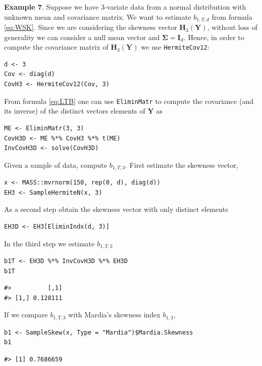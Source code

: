 \textbf{Example 7}. Suppose we have \(3\)-variate data from a normal distribution with unknown mean and covariance matrix. We want to estimate \(b_{1,T,d}\) from formula \eqref{eq:WSK}. Since we are considering the skewness vector \(\mathbf{H}_3(\mathbf{Y})\), without loss of generality we can consider a null mean vector and \(\boldsymbol{\Sigma}= \mathbf{I}_d\). Hence, in order to compute the covariance matrix of \(\mathbf{H}_3(\mathbf{Y})\) we use \texttt{HermiteCov12}:

\begin{verbatim}
d <- 3
Cov <- diag(d)
CovH3 <- HermiteCov12(Cov, 3)
\end{verbatim}

From formula \eqref{eq:LTB} one can use \texttt{EliminMatr} to compute the covariance (and its inverse) of the distinct vectors elements of \(\mathbf{Y}\) as

\begin{verbatim}
ME <- EliminMatr(3, 3)
CovH3D <- ME %*% CovH3 %*% t(ME)
InvCovH3D <- solve(CovH3D)
\end{verbatim}

Given a sample of data, compute \(b_{1,T,3}\). First estimate the skewness vector,

\begin{verbatim}
x <- MASS::mvrnorm(150, rep(0, d), diag(d))
EH3 <- SampleHermiteN(x, 3)
\end{verbatim}

As a second step obtain the skewness vector with only distinct elements

\begin{verbatim}
EH3D <- EH3[EliminIndx(d, 3)]
\end{verbatim}

In the third step we estimate \(b_{1,T,3}\)

\begin{verbatim}
b1T <- EH3D %*% InvCovH3D %*% EH3D
b1T
\end{verbatim}

\begin{verbatim}
#>          [,1]
#> [1,] 0.128111
\end{verbatim}

If we compare \(b_{1,T,3}\) with Mardia's skewness index \(b_{1,3}\),

\begin{verbatim}
b1 <- SampleSkew(x, Type = "Mardia")$Mardia.Skewness
b1
\end{verbatim}

\begin{verbatim}
#> [1] 0.7686659
\end{verbatim}

